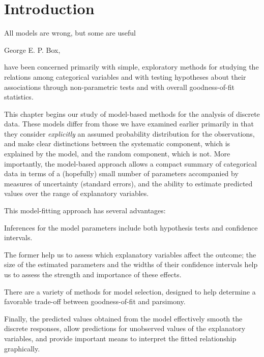 \documentclass[11pt]{book}
\begin{document}


\section{Introduction}\label{sec:logist-intro}

\epigraph{All models are wrong, but some are useful}{George E. P. Box, \citep[p. 424]{BoxDraper:1987}}

have been concerned primarily with simple,
exploratory methods for studying the relations among categorical
variables and with testing hypotheses about their associations
through non-parametric tests and with overall goodness-of-fit
statistics.

This chapter begins our study of model-based methods for the analysis
of discrete data.  These models differ from those we have examined
earlier primarily in that they consider \emph{explicitly} an
assumed probability distribution for the observations, and make
clear distinctions between the systematic component, which is
explained by the model, and the random component, which is not.
More importantly, the model-based approach allows a compact summary
of categorical data in terms of a (hopefully) small number of
parameters accompanied by measures of uncertainty (standard errors),
and the ability to estimate predicted values over the range of
explanatory variables.

This model-fitting approach has several advantages:
\begin{seriate}
\item Inferences for the model parameters include both hypothesis tests
and confidence intervals.  
\item The former help us to assess which
explanatory variables affect the outcome;  the size of the estimated
parameters and the widths of their confidence intervals help us to
assess the strength and importance of these effects.
\item There are a variety of methods for model selection, designed
to help determine a favorable trade-off between goodness-of-fit
and parsimony.
\item Finally, the predicted values obtained from the model effectively
smooth the discrete responses, allow predictions for unobserved
values of the explanatory variables, and
provide important means to interpret the fitted relationship graphically.
\end{seriate}
\end{document}
